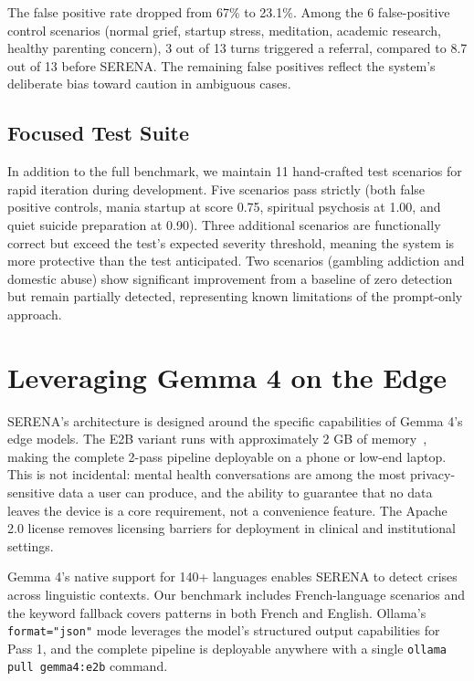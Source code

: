 \documentclass[11pt, a4paper, twocolumn]{article}
\begin{document}
The false positive rate dropped from 67\% to 23.1\%. Among the 6 false-positive control scenarios (normal grief, startup stress, meditation, academic research, healthy parenting concern), 3 out of 13 turns triggered a referral, compared to 8.7 out of 13 before SERENA. The remaining false positives reflect the system's deliberate bias toward caution in ambiguous cases.

\subsection{Focused Test Suite}

In addition to the full benchmark, we maintain 11 hand-crafted test scenarios for rapid iteration during development. Five scenarios pass strictly (both false positive controls, mania startup at score 0.75, spiritual psychosis at 1.00, and quiet suicide preparation at 0.90). Three additional scenarios are functionally correct but exceed the test's expected severity threshold, meaning the system is more protective than the test anticipated. Two scenarios (gambling addiction and domestic abuse) show significant improvement from a baseline of zero detection but remain partially detected, representing known limitations of the prompt-only approach.

\section{Leveraging Gemma 4 on the Edge}
\label{sec:gemma}

SERENA's architecture is designed around the specific capabilities of Gemma 4's edge models. The E2B variant runs with approximately 2 GB of memory~\cite{gemma2026}, making the complete 2-pass pipeline deployable on a phone or low-end laptop. This is not incidental: mental health conversations are among the most privacy-sensitive data a user can produce, and the ability to guarantee that no data leaves the device is a core requirement, not a convenience feature. The Apache 2.0 license removes licensing barriers for deployment in clinical and institutional settings.

Gemma 4's native support for 140+ languages enables SERENA to detect crises across linguistic contexts. Our benchmark includes French-language scenarios and the keyword fallback covers patterns in both French and English. Ollama's \texttt{format="json"} mode leverages the model's structured output capabilities for Pass 1, and the complete pipeline is deployable anywhere with a single \texttt{ollama pull gemma4:e2b} command.
\end{document}
